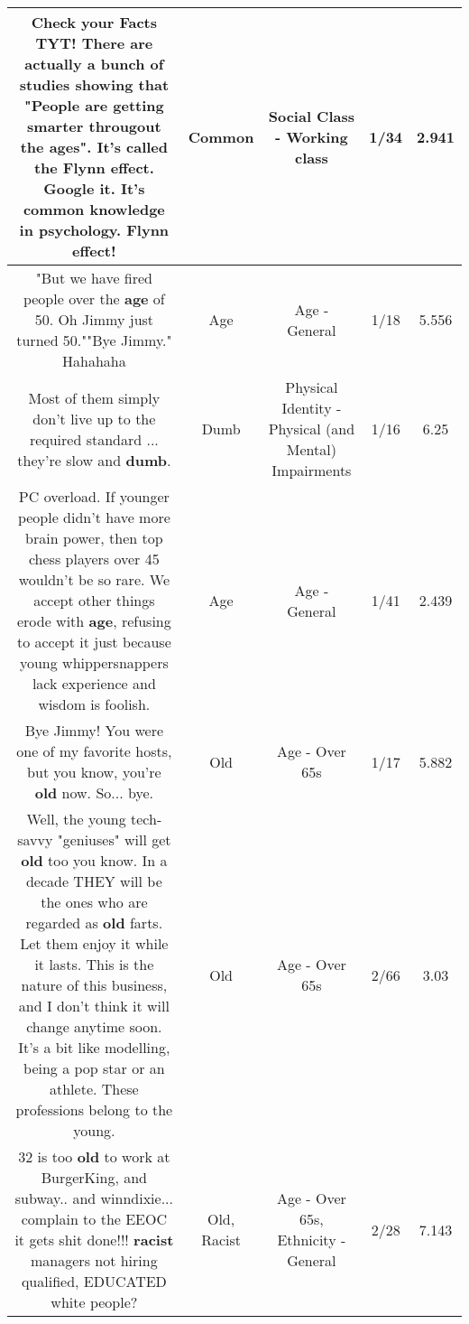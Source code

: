 \documentclass[11pt]{article}
\newlength\mylength
\begin{document}
\begin{center}
\begin{longtable}{|C{.65\mylength}|C{.30\mylength}|C{.12\mylength}|C{.12\mylength}|C{.12\mylength}|}
  \small Check your Facts TYT! There are actually a bunch of studies showing that "People are getting smarter througout the ages". It's called the Flynn effect. Google it. It's \textbf{common} knowledge in psychology. Flynn effect!\normalsize   & Common & Social Class - Working class & 1/34 & 2.941 \\  \hline
  \small "But we have fired people over the \textbf{age} of 50. Oh Jimmy just turned 50.""Bye Jimmy." Hahahaha\normalsize   & Age & Age - General & 1/18 & 5.556 \\  \hline
  \small Most of them simply don't live up to the required standard ... they're slow and \textbf{dumb}.\normalsize   & Dumb & Physical Identity - Physical (and Mental) Impairments & 1/16 & 6.25 \\  \hline
  \small PC overload. If younger people didn't have more brain power, then top chess players over 45 wouldn't be so rare. We accept other things erode with \textbf{age}, refusing to accept it just because young whippersnappers lack experience and wisdom is foolish.\normalsize   & Age & Age - General & 1/41 & 2.439 \\  \hline
  \small Bye Jimmy! You were one of my favorite hosts, but you know, you're \textbf{old} now. So... bye.\normalsize   & Old & Age - Over 65s & 1/17 & 5.882 \\  \hline
  \small Well, the young tech-savvy "geniuses" will get \textbf{old} too you know. In a decade THEY will be the ones who are regarded as \textbf{old} farts. Let them enjoy it while it lasts. This is the nature of this business, and I don't think it will change anytime soon. It's a bit like modelling, being a pop star or an athlete. These professions belong to the young.\normalsize   & Old & Age - Over 65s & 2/66 & 3.03 \\  \hline
  \small 32 is too \textbf{old} to work at BurgerKing, and subway.. and winndixie...  complain to the EEOC it gets shit done!!!  \textbf{racist} managers not hiring qualified, EDUCATED white people?\normalsize   & Old, Racist & Age - Over 65s, Ethnicity - General & 2/28 & 7.143 \\  \hline

\end{longtable}
\end{center}
\end{document}
